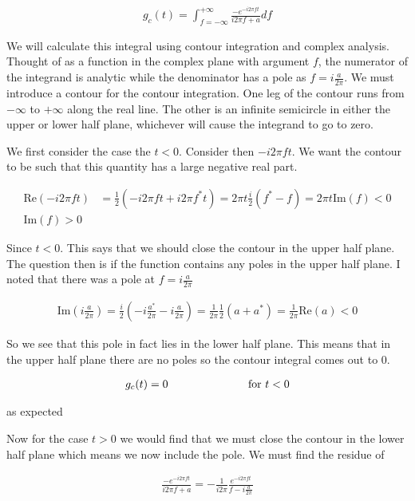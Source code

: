 \documentclass[12pt]{article}
\begin{document}
\begin{align}
g_c(t) = \int_{f=-\infty}^{+\infty} \frac{-e^{-i2\pi ft}}{i2\pi f + a} df
\end{align}

We will calculate this integral using contour integration and complex analysis. Thought of as a function in the complex plane with argument $f$, the numerator of the integrand is analytic while the denominator has a pole as $f = i\frac{a}{2\pi}$. We must introduce a contour for the contour integration. One leg of the contour runs from $-\infty$ to $+\infty$ along the real line. The other is an infinite semicircle in either the upper or lower half plane, whichever will cause the integrand to go to zero.

We first consider the case the $t<0$. Consider then $-i 2 \pi f t$. We want the contour to be such that this quantity has a large negative real part.

\begin{align}
\text{Re}(-i 2 \pi f t) &= \frac{1}{2}(-i 2 \pi f t + i 2 \pi f^* t) = 2\pi t \frac{i}{2}(f^*-f) = 2 \pi t \text{Im}(f) < 0\\
\text{Im}(f) > 0
\end{align}

Since $t<0$. This says that we should close the contour in the upper half plane. The question then is if the function contains any poles in the upper half plane. I noted that there was a pole at $f = i \frac{a}{2\pi}$

\begin{align}
\text{Im}\left(i \frac{a}{2\pi}\right) = \frac{i}{2}\left(-i \frac{a^*}{2\pi} - i \frac{a}{2\pi} \right) = \frac{1}{2\pi} \frac{1}{2}(a + a^*) = \frac{1}{2 \pi} \text{Re}(a) < 0
\end{align}

So we see that this pole in fact lies in the lower half plane. This means that in the upper half plane there are no poles so the contour integral comes out to 0.

\begin{align}
g_c(t) = 0 \hspace{1 in} \text{for } t<0
\end{align}

as expected

Now for the case $t>0$ we would find that we must close the contour in the lower half plane which means we now include the pole. We must find the residue of 

\begin{align}
\frac{-e^{-i2\pi ft}}{i2\pi f + a} = -\frac{1}{i 2 \pi} \frac{e^{-i 2 \pi f t}}{f - i \frac{a}{2\pi}}
\end{align}
\end{document}

